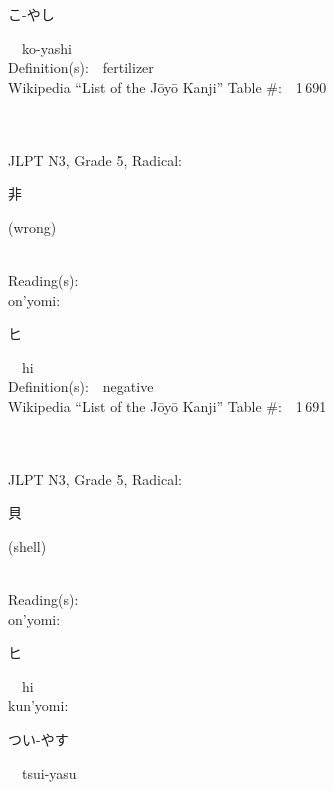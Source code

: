 \begin{multicols}{2}
{\hspace*{2em}}{\begin{CJK}{UTF8}{min} こ-やし \end{CJK}}\ \ ko-yashi\ \ \\
Definition(s):\ \ fertilizer \\
Wikipedia ``List of the J\=oy\=o Kanji'' Table \#:\ \ 1\,690 \\
\ \ \\
{\fontsize{34pt}{40pt}  }\ \ \\  %
{JLPT N3, Grade 5, Radical:\ \ {\begin{CJK}{UTF8}{min} 非 \end{CJK}} (wrong) } \\
Reading(s):\ \ \\
{\hspace*{1em}}on'yomi:\ \ \\
{\hspace*{2em}}{\begin{CJK}{UTF8}{min} ヒ \end{CJK}}\ \ hi\ \ \\
Definition(s):\ \ negative \\
Wikipedia ``List of the J\=oy\=o Kanji'' Table \#:\ \ 1\,691 \\
\ \ \\
{\fontsize{34pt}{40pt}  }\ \ \\  %
{JLPT N3, Grade 5, Radical:\ \ {\begin{CJK}{UTF8}{min} 貝 \end{CJK}} (shell) } \\
Reading(s):\ \ \\
{\hspace*{1em}}on'yomi:\ \ \\
{\hspace*{2em}}{\begin{CJK}{UTF8}{min} ヒ \end{CJK}}\ \ hi\ \ \\
{\hspace*{1em}}kun'yomi:\ \ \\
{\hspace*{2em}}{\begin{CJK}{UTF8}{min} つい-やす \end{CJK}}\ \ tsui-yasu\ \ \\

\end{multicols}
